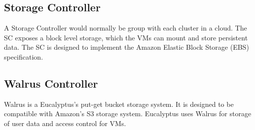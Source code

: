 \subsection{Storage Controller}
A Storage Controller would normally be group with each cluster in a cloud.  The SC exposes a block level storage, which the VMs can mount and store persistent data.  The SC is designed to implement the Amazon Elastic Block Storage (EBS) specification.

\subsection{Walrus Controller}
Walrus is a Eucalyptus's put-get bucket storage system.  It is designed to be compatible with Amazon's S3 storage system.  Eucalyptus uses Walrus for storage of user data and access control for VMs.
